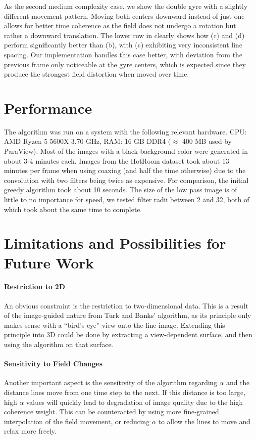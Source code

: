As the second medium complexity case, we show the double gyre with a slightly different movement pattern.
Moving both centers downward instead of just one allows for better time coherence as the field does not
undergo a rotation but rather a downward translation.
The lower row in  clearly shows how (c) and (d) perform significantly better than (b),
with (c) exhibiting very inconsistent line spacing. Our implementation handles this case better,
with deviation from the previous frame only noticeable at the gyre centers, which is expected since
they produce the strongest field distortion when moved over time.

\newpage




\section{Performance}
The algorithm was run on a system with the following relevant hardware.
CPU: AMD Ryzen 5 5600X 3.70 GHz, RAM: 16 GB DDR4 ($\approx$ 400 MB used by ParaView).
Most of the images with a black background color were generated in about 3-4 minutes each.
Images from the HotRoom dataset took about 13 minutes per frame
when using coaxing (and half the time otherwise) due to the convolution with two filters being twice as expensive.
For comparison, the initial greedy algorithm took about 10 seconds.
The size of the low pass image is of little to no importance for speed, we tested filter radii between 2 and 32,
both of which took about the same time to complete.

\newpage
\section{Limitations and Possibilities for Future Work}
\paragraph*{Restriction to 2D}
An obvious constraint is the restriction to two-dimensional data.
This is a result of the image-guided nature from Turk and Banks' algorithm,
as its principle only makes sense with a ``bird's eye'' view onto the line image.
Extending this principle into 3D could be done by extracting a view-dependent surface,
and then using the algorithm on that surface. 

\paragraph*{Sensitivity to Field Changes}
Another important aspect is the sensitivity of the algorithm regarding $\alpha$
and the distance lines move from one time step to the next.
If this distance is too large, high $\alpha$ values will quickly lead to degradation
of image quality due to the high coherence weight.
This can be counteracted by using more fine-grained interpolation of the field movement,
or reducing $\alpha$ to allow the lines to move and relax more freely.

